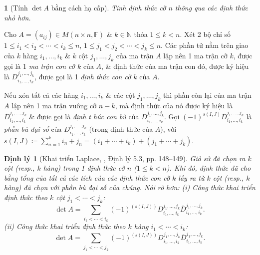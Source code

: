 \documentclass{article}
\newtheorem{baitoan}{}
\newtheorem{dinhly}{Định lý}
\begin{document}
\begin{baitoan}[Tính $\det A$ bằng cách hạ cấp]
	Tính định thức cỡ $n$ thông qua các định thức nhỏ hơn.
\end{baitoan}
Cho $A = (a_{ij})\in M(n\times n,\mathbb{F})$ \& $k\in\mathbb{N}$ thỏa $1\le k < n$. Xét 2 bộ chỉ số $1\le i_1 < i_2 < \cdots < i_k\le n$, $1\le j_1 < j_2 < \cdots < j_k\le n$. Các phần tử nằm trên giao của $k$ hàng $i_1,\ldots,i_k$ \& $k$ cột $j_1,\ldots,j_k$ của ma trận $A$ lập nên 1 ma trận cỡ $k$, được gọi là 1 {\it ma trận con cỡ $k$} của $A$, \& định thức của ma trận con đó, được ký hiệu là $D_{i_1,\ldots,i_k}^{j_1,\ldots,j_k}$, được gọi là 1 {\it định thức con cỡ $k$} của $A$.

Nếu xóa tất cả các hàng $i_1,\ldots,i_k$ \& các cột $j_1,\ldots,j_k$ thì phần còn lại của ma trận $A$ lập nên 1 ma trận vuông cỡ $n - k$, mà định thức của nó được ký hiệu là $\overline{D}_{i_1,\ldots,i_k}^{j_1,\ldots,j_k}$ \& được gọi là {\it định t hức con bù} của $D_{i_1,\ldots,i_k}^{j_1,\ldots,j_k}$. Gọi $(-1)^{s(I,J)}\overline{D}_{i_1,\ldots,i_k}^{j_1,\ldots,j_k}$ là {\it phần bù đại số} của $D_{i_1,\ldots,i_k}^{j_1,\ldots,j_k}$ (trong định thức của $A$), với $s(I,J)\coloneqq\sum_{n=1}^k i_n + j_n = (i_1 + \cdots + i_k) + (j_1 + \cdots + j_k)$.

\begin{dinhly}[Khai triển Laplace, \cite{Hung_linear_algebra}, Định lý 5.3, pp. 148--149]
	Giả sử đã chọn ra $k$ cột (resp., $k$ hàng) trong 1 định thức cỡ $n$ ($1\le k < n$). Khi đó, định thức đã cho bằng tổng của tất cả các tích của các định thức con cỡ $k$ lấy ra từ $k$ cột (resp., $k$ hàng) đã chọn với phần bù đại số của chúng. Nói rõ hơn: (i) Công thức khai triển định thức theo $k$ cột $j_1 < \cdots < j_k$:
	\begin{equation*}
		\det A = \sum_{i_1 < \cdots < i_k} (-1)^{(s(I,J))}D_{i_1,\ldots,i_k}^{j_1,\ldots,j_k}\overline{D}_{i_1,\ldots,i_k}^{j_1,\ldots,j_k}.
	\end{equation*}
	(ii) Công thức khai triển định thức theo $k$ hàng $i_1 < \cdots < i_k$:
	\begin{equation*}
		\det A = \sum_{j_1 < \cdots < j_k} (-1)^{(s(I,J))}D_{i_1,\ldots,i_k}^{j_1,\ldots,j_k}\overline{D}_{i_1,\ldots,i_k}^{j_1,\ldots,j_k}.
	\end{equation*}
\end{dinhly}
\end{document}

